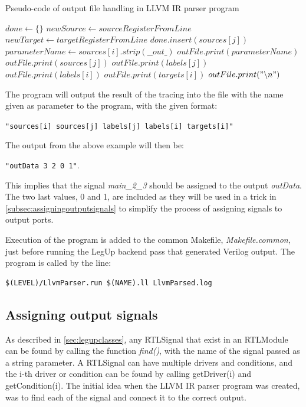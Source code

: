 \begin{algorithm}
  \caption{Pseudo-code of output file handling in LLVM IR parser program
  \label{alg:llvmparserpart2}}
  \begin{algorithmic}[1]
    \State $done \leftarrow \{\}$
            \State $newSource \leftarrow sourceRegisterFromLine$
            \State $newTarget \leftarrow targetRegisterFromLine$
            \State $done.insert(sources[j])$
              \State $parameterName \leftarrow sources[i].strip(\_\_out\_)$
              \State $outFile.print(parameterName)$
              \State $outFile.print(sources[j])$
              \State $outFile.print(labels[j])$
              \State $outFile.print(labels[i])$
              \State $outFile.print(targets[i])$
              \State $outFile.print("\backslash n")$ 
            \EndIf
          \EndIf
        \EndFor
      \EndFor
    \EndIf
  \end{algorithmic}
\end{algorithm}

The program will output the result of the tracing into the file with the name given as parameter to the program, with the given format:

\verb!"sources[i] sources[j] labels[j] labels[i] targets[i]"!

The output from the above example will then be:

\verb!"outData 3 2 0 1"!.

This implies that the signal \textit{main\_2\_3} should be assigned to the output \textit{outData}. The two last values, 0 and 1, are included as they will be used in a trick in \cref{subsec:assigningoutputsignals} to simplify the process of assigning signals to output ports.

Execution of the program is added to the common Makefile, \textit{Makefile.common}, just before running the LegUp backend pass that generated Verilog output. The program is called by the line:
\begin{verbatim}
$(LEVEL)/LlvmParser.run $(NAME).ll LlvmParsed.log
\end{verbatim}

\subsection{\label{subsec:assigningoutputsignals}Assigning output signals}
As described in \cref{sec:legupclasses}, any RTLSignal that exist in an RTLModule can be found by calling the function \textit{find()}, with the name of the signal passed as a string parameter. A RTLSignal can have multiple drivers and conditions, and the i-th driver or condition can be found by calling getDriver(i) and getCondition(i). The initial idea when the LLVM IR parser program was created, was to find each of the signal and connect it to the correct output.

